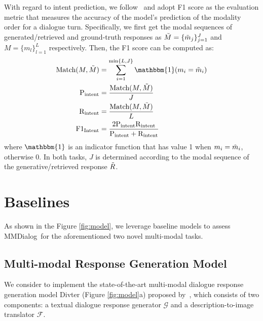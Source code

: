 \documentclass[11pt]{article}
\newcommand{\DataName}{MMDialog}
\begin{document}
With regard to intent prediction, we follow~\citet{zang-etal-2021-photochat} and adopt F1 score as the evaluation metric that measures the accuracy of the model's prediction of the modality order for a dialogue turn. Specifically, we first get the modal sequences of generated/retrieved and ground-truth responses as $\Tilde{M}=\{\Tilde{m}_j\}_{j=1}^J$ and $M=\{m_l\}_{l=1}^L$ respectively. Then, the F1 score can be computed as:
\begin{equation}
    \begin{aligned}
         \text{Match}(M, \Tilde{M}) &= \sum_{i=1}^{\min\{L, J \}}\mathbbm{1} (m_i = \Tilde{m}_i) \\
         \text{P}_{\text{intent}} &= \frac{\text{Match}(M, \Tilde{M})}{J} \\
         \text{R}_{\text{intent}} &= \frac{\text{Match}(M, \Tilde{M})}{L} \\
         \text{F1}_{\text{Intent}} &= \frac{2\text{P}_{\text{intent}}\text{R}_{\text{intent}}}{\text{P}_{\text{intent}} + \text{R}_{\text{intent}}}
    \end{aligned}
\end{equation}
where $\mathbbm{1}$ is an indicator function that has value 1 when $m_i = \Tilde{m}_i$, otherwise 0. In both tasks, $J$ is determined according to the modal sequence of the generative/retrieved response $\Tilde{R}$. 



















 
\section{Baselines}
As shown in the Figure \ref{fig:model}, we leverage baseline models to assess \DataName~for the aforementioned two novel multi-modal tasks.

\subsection{Multi-modal Response Generation Model}
We consider to implement the state-of-the-art multi-modal dialogue response generation model Divter (Figure \ref{fig:model}a) proposed by~\citet{sun-etal-2022-multimodal}, which consists of two components: a textual dialogue response generator $\mathcal{G}$ and a description-to-image translator $\mathcal{F}$. 
\end{document}
